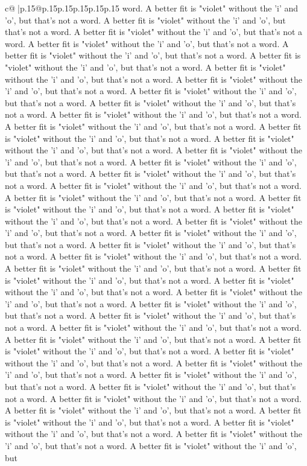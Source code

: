 \documentclass{article}
\begin{document}
{\begin{supertabular}{c@{$\;$}|p{.15\linewidth}@{}p{.15\linewidth}p{.15\linewidth}p{.15\linewidth}p{.15\linewidth}p{.15\linewidth}}
{{{word. A better fit is "violet" without the 'i' and 'o', but that's not a word. A better fit is "violet" without the 'i' and 'o', but that's not a word. A better fit is "violet" without the 'i' and 'o', but that's not a word. A better fit is "violet" without the 'i' and 'o', but that's not a word. A better fit is "violet" without the 'i' and 'o', but that's not a word. A better fit is "violet" without the 'i' and 'o', but that's not a word. A better fit is "violet" without the 'i' and 'o', but that's not a word. A better fit is "violet" without the 'i' and 'o', but that's not a word. A better fit is "violet" without the 'i' and 'o', but that's not a word. A better fit is "violet" without the 'i' and 'o', but that's not a word. A better fit is "violet" without the 'i' and 'o', but that's not a word. A better fit is "violet" without the 'i' and 'o', but that's not a word. A better fit is "violet" without the 'i' and 'o', but that's not a word. A better fit is "violet" without the 'i' and 'o', but that's not a word. A better fit is "violet" without the 'i' and 'o', but that's not a word. A better fit is "violet" without the 'i' and 'o', but that's not a word. A better fit is "violet" without the 'i' and 'o', but that's not a word. A better fit is "violet" without the 'i' and 'o', but that's not a word. A better fit is "violet" without the 'i' and 'o', but that's not a word. A better fit is "violet" without the 'i' and 'o', but that's not a word. A better fit is "violet" without the 'i' and 'o', but that's not a word. A better fit is "violet" without the 'i' and 'o', but that's not a word. A better fit is "violet" without the 'i' and 'o', but that's not a word. A better fit is "violet" without the 'i' and 'o', but that's not a word. A better fit is "violet" without the 'i' and 'o', but that's not a word. A better fit is "violet" without the 'i' and 'o', but that's not a word. A better fit is "violet" without the 'i' and 'o', but that's not a word. A better fit is "violet" without the 'i' and 'o', but that's not a word. A better fit is "violet" without the 'i' and 'o', but that's not a word. A better fit is "violet" without the 'i' and 'o', but that's not a word. A better fit is "violet" without the 'i' and 'o', but that's not a word. A better fit is "violet" without the 'i' and 'o', but that's not a word. A better fit is "violet" without the 'i' and 'o', but that's not a word. A better fit is "violet" without the 'i' and 'o', but that's not a word. A better fit is "violet" without the 'i' and 'o', but that's not a word. A better fit is "violet" without the 'i' and 'o', but that's not a word. A better fit is "violet" without the 'i' and 'o', but that's not a word. A better fit is "violet" without the 'i' and 'o', but that's not a word. A better fit is "violet" without the 'i' and 'o', but that's not a word. A better fit is "violet" without the 'i' and 'o', but that's not a word. A better fit is "violet" without the 'i' and 'o', but that's not a word. A better fit is "violet" without the 'i' and 'o', but that's not a word. A better fit is "violet" without the 'i' and 'o', but that's not a word. A better fit is "violet" without the 'i' and 'o', but }}}
\end{supertabular}}
\end{document}
